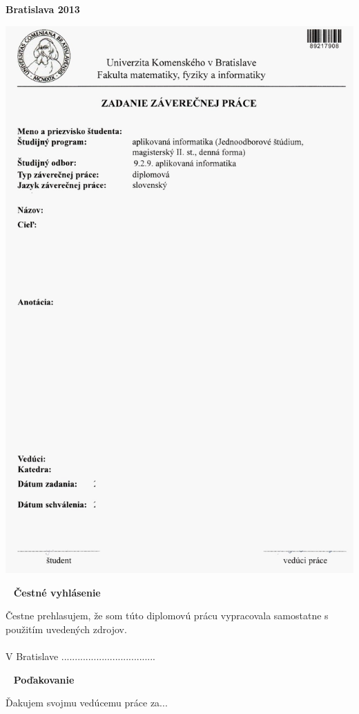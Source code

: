 
\vfill
\noindent
{\bf Bratislava 2013}  \hfill {\bf \autor}
\thispagestyle{empty}

\newpage
\thispagestyle{empty}
\vspace*{-35px}\hspace*{-30px}
\includegraphics[scale=2.0]{pics/zadanie.jpg}

\newpage
{~}\vfill
{\noindent \large\bf Čestné vyhlásenie} 
\vspace{1.5cm}

Čestne prehlasujem, že som túto diplomovú prácu vypracovala samostatne s použitím uvedených zdrojov.\\\\ 
V Bratislave
\hfill ................................... 
\vspace{1cm}

\newpage
{~}\vfill
{\noindent\large\bf Poďakovanie} 
\vspace{1.5cm}

Ďakujem svojmu vedúcemu práce za...  \\
\vspace{1cm}

\newpage

